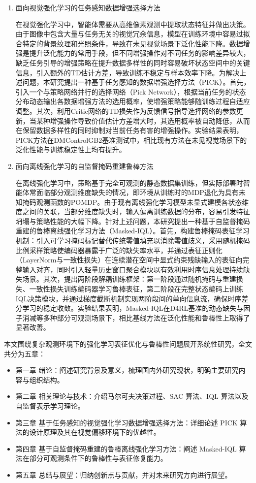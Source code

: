 \begin{enumerate}[label=\arabic*）]
    \item 面向视觉强化学习的任务感知数据增强选择方法

    在视觉强化学习中，智能体需要从高维像素观测中提取状态特征并做出决策。由于图像中包含大量与任务无关的视觉冗余信息，模型在训练环境中容易过拟合特定的背景纹理和光照条件，导致在未见视觉场景下泛化性能下降。数据增强是提升泛化能力的常用手段，但不同增强操作对不同任务的影响差异较大，缺乏任务引导的增强策略在提升数据多样性的同时容易破坏状态空间中的关键信息，引入额外的TD估计方差，导致训练不稳定与样本效率下降。为解决上述问题，本研究提出一种基于任务感知的数据增强选择方法（PICK）。首先，引入一个与策略网络并行的选择网络（Pick Network），根据当前任务的状态分布动态输出各数据增强方法的选用概率，使增强策略能够随训练过程自适应调整。其次，利用Critic网络的TD损失作为反馈信号指导选择网络的参数更新，当某种增强操作导致价值估计方差增大时，其选用概率被自动降低，从而在保留数据多样性的同时抑制对当前任务有害的增强操作。实验结果表明，PICK方法在DMControlGB2基准测试中，相比现有方法在未见视觉场景下的泛化性能与训练稳定性上均有提升。

    \item 面向离线强化学习的自监督掩码重建鲁棒方法

    在离线强化学习中，策略基于完全可观测的静态数据集训练，但实际部署时智能体常面临部分观测维度缺失的情况，即环境从训练时的MDP退化为具有未知掩码观测函数的POMDP。由于现有离线强化学习模型未显式建模各状态维度之间的关联，当部分维度缺失时，输入偏离训练数据的分布，容易引发特征坍塌与策略性能的大幅下降。针对上述问题，本研究提出一种基于自监督掩码重建的鲁棒离线强化学习方法（Masked-IQL）。首先，构建鲁棒掩码表征学习机制：引入可学习掩码标记替代传统零值填充以消除零值歧义，采用随机掩码比例采样策略使编码器暴露于广泛的缺失率水平，并通过表征正则化（LayerNorm与一致性损失）在连续潜在空间中显式约束残缺输入的表征向完整输入对齐，同时引入轻量历史窗口聚合模块以有效利用时序信息处理持续缺失场景。其次，提出两阶段解耦训练框架：第一阶段通过随机掩码与重建损失、一致性损失训练编码器学习鲁棒表征，第二阶段在完整状态编码上训练IQL决策模块，并通过梯度截断机制实现两阶段间的单向信息流，确保时序差分学习的稳定收敛。实验结果表明，Masked-IQL在D4RL基准的动态缺失与因子消减等多种部分可观测场景下，相比基线方法在泛化性能和鲁棒性上取得了显著改善。
\end{enumerate}


本文围绕复杂观测环境下的强化学习表征优化与鲁棒性问题展开系统性研究，全文共分为五章：
\begin{itemize}
    \item 第一章 绪论：阐述研究背景及意义，梳理国内外研究现状，明确主要研究内容与组织结构。
    \item 第二章 相关理论与技术：介绍马尔可夫决策过程、SAC 算法、IQL 算法以及自监督表示学习理论。
    \item 第三章 基于任务感知的视觉强化学习数据增强选择方法：详细论述 PICK 算法的设计原理及其在视觉偏移环境下的优越性。
    \item 第四章 基于自监督掩码重建的鲁棒离线强化学习方法：阐述 Masked-IQL 算法在部分可观测条件下的鲁棒性与表征修复能力。
    \item 第五章 总结与展望：归纳创新点与贡献，并对未来研究方向进行展望。
\end{itemize}